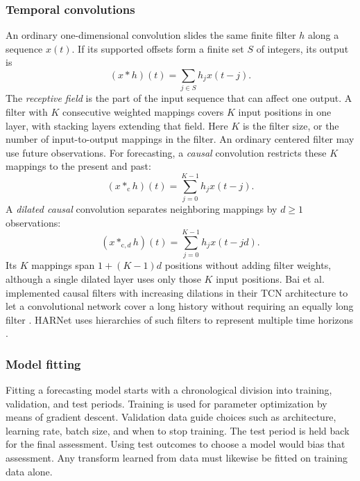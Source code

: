 \documentclass[12pt,a4paper]{article}
\numberwithin{equation}{section}
\numberwithin{table}{section}
\numberwithin{figure}{section}
\begin{document}
\subsubsection{Temporal convolutions}
An ordinary one-dimensional convolution slides the same finite filter $h$ along a sequence $x(t)$. If its supported offsets form a finite set $S$ of integers, its output is
\begin{equation}\label{eq:ordinary-convolution}
(x*h)(t)=\sum_{j\in S}h_jx(t-j).
\end{equation}
The \emph{receptive field} is the part of the input sequence that can affect one output. A filter with $K$ consecutive weighted mappings covers $K$ input positions in one layer, with stacking layers extending that field. Here $K$ is the filter size, or the number of input-to-output mappings in the filter. An ordinary centered filter may use future observations. For forecasting, a \emph{causal} convolution restricts these $K$ mappings to the present and past:
\begin{equation}\label{eq:causal-convolution}
(x*_{\mathrm c}h)(t)=\sum_{j=0}^{K-1}h_jx(t-j).
\end{equation}
A \emph{dilated causal} convolution separates neighboring mappings by $d\geq1$ observations:
\begin{equation}\label{eq:causal-dilated-convolution}
(x*_{\mathrm c,d}h)(t)=\sum_{j=0}^{K-1}h_jx(t-jd).
\end{equation}
Its $K$ mappings span $1+(K-1)d$ positions without adding filter weights, although a single dilated layer uses only those $K$ input positions. Bai et al. implemented causal filters with increasing dilations in their TCN architecture to let a convolutional network cover a long history without requiring an equally long filter \cite{bai2018}. HARNet uses hierarchies of such filters to represent multiple time horizons \cite{reisenhofer2022}.

\subsubsection{Model fitting}
Fitting a forecasting model starts with a chronological division into training, validation, and test periods. Training is used for parameter optimization by means of gradient descent. Validation data guide choices such as architecture, learning rate, batch size, and when to stop training. The test period is held back for the final assessment. Using test outcomes to choose a model would bias that assessment. Any transform learned from data must likewise be fitted on training data alone.
\end{document}
